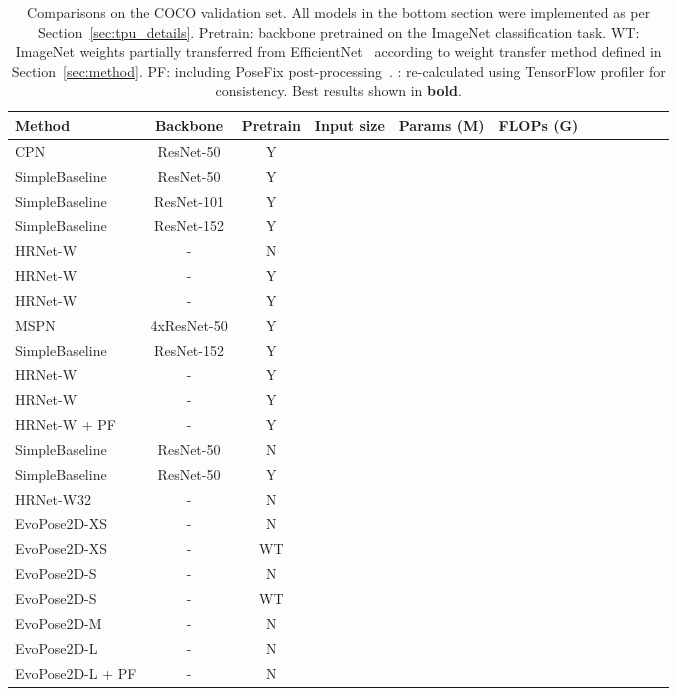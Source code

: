 \documentclass[final]{cvpr}
\begin{document}
\begin{table*}
\vspace{-8pt}
\footnotesize
\centering
\begin{tabular}{l|c|c|c|c|c|c|ccccc}
\hline
Method & Backbone & Pretrain & Input size & Params (M) & FLOPs (G) & 
 &  &  &  &  &  \\
\hline
CPN~\cite{chen2018cascaded}& ResNet-50 & Y &  &  & &
&&&&&\\ 
SimpleBaseline~\cite{xiao2018simple} & ResNet-50 & Y &   & &
& & &&&&\\
SimpleBaseline~\cite{xiao2018simple} & ResNet-101 & Y &   & &
& & &&&&\\
SimpleBaseline~\cite{xiao2018simple} & ResNet-152  & Y &  & &
& & &&&&\\
HRNet-W~\cite{sun2019deep} & - & N & &   &  &
&&&&&  \\
HRNet-W~\cite{sun2019deep} & - & Y & &   &  &
&&&&&  \\
HRNet-W~\cite{sun2019deep} & - & Y &  &   & &
&&&&&  \\
MSPN~\cite{li2019rethinking} & 4xResNet-50 & Y &  &   & & &&&&&  \\
SimpleBaseline~\cite{xiao2018simple} & ResNet-152  & Y &   & &
& & &&&&\\
HRNet-W~\cite{sun2019deep} & - & Y &  &   & & &&&&&  \\
HRNet-W~\cite{sun2019deep} & - & Y &  &   & & &&&&&  \\
HRNet-W + PF~\cite{moon2019posefix} & - & Y &  &   & & &&&&&  \\
\hline
SimpleBaseline & ResNet-50 & N &   & &
& & &&&&\\
SimpleBaseline & ResNet-50 & Y &   & &
& & &&&&\\
HRNet-W32 & - & N &  & &
& & &&&&\\
EvoPose2D-XS & - & N &  & &
& & &&&&\\
EvoPose2D-XS & - & WT &  & &
& & &&&&\\
EvoPose2D-S & - & N &  & &
& & &&&&\\
EvoPose2D-S & - & WT &  & &
& & &&&&\\
EvoPose2D-M & - & N &  & &
& & &&&&\\
EvoPose2D-L & - & N &  & &
& & &&&&\\
EvoPose2D-L + PF & - & N &  & &
& & &&&&\\
\hline
\end{tabular}
\vspace{-2pt}
\caption{Comparisons on the COCO validation set. All models in the bottom section were implemented as per Section~\ref{sec:tpu_details}. Pretrain: backbone pretrained on the ImageNet classification task. WT: ImageNet weights partially transferred from EfficientNet~\cite{tan2019efficientnet} according to weight transfer method defined in Section~\ref{sec:method}. PF: including PoseFix post-processing~\cite{moon2019posefix}. \linebreak: re-calculated using TensorFlow profiler for consistency. Best results shown in \textbf{bold}.}
\label{tab:coco_val}
\end{table*}
\end{document}
